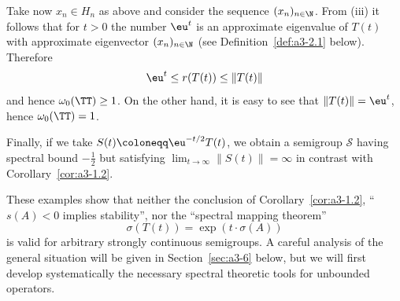 Take now $x_{n} \in H_{n}$ as above and consider the sequence $(x_{n})_{n \in \N}$.
From (iii) it follows that for $t > 0$ the number $\eu^{t}$ is an approximate eigenvalue of\/ $T(t)$ with approximate eigenvector $(x_{n})_{n \in \N}$ (see Definition~\ref{def:a3-2.1} below).
Therefore 
%
\[
	 \eu^{t} \leq r(T(t)) \leq \|T(t)\|
\]
%
and hence $\omega_{0}(\TT) \geq 1$.
On the other hand, it is easy to see that $\|T(t)\| = \eu^{t}$, hence $\omega_{0}(\TT) = 1$.


Finally, if we take $S(t) \coloneqq \eu^{-t/2}T(t)$, we obtain a semigroup $\mathcal{S}$ 
having spectral bound $-\frac{1}{2}$ but satisfying $\lim_{t \to \infty} \|S(t)\| = \infty$ in contrast with Corollary~\ref{cor:a3-1.2}.

These examples show that neither the conclusion of Corollary~\ref{cor:a3-1.2}, \ie \enquote{$s(A) < 0$ implies stability}, nor the \enquote{spectral mapping theorem}
\[
    \sigma(T(t)) = \exp(t\cdot\sigma(A))
\]
is valid for arbitrary strongly continuous semigroups.
A careful analysis of the general situation will be given in Section~\ref{sec:a3-6} below, but we will first develop systematically the necessary spectral theoretic tools for unbounded operators.
